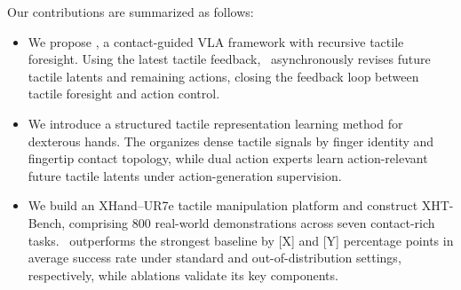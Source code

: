 Our contributions are summarized as follows:



\begin{itemize}
    \item We propose \systemname, a contact-guided VLA framework with recursive tactile foresight. Using the latest tactile feedback, \systemname\ asynchronously revises future tactile latents and remaining actions, closing the feedback loop between tactile foresight and action control.

    \item We introduce a structured tactile representation learning method for dexterous hands. The \Encoder organizes dense tactile signals by finger identity and fingertip contact topology, while dual action experts learn action-relevant future tactile latents under action-generation supervision.

    \item We build an XHand--UR7e tactile manipulation platform and construct XHT-Bench, comprising 800 real-world demonstrations across seven contact-rich tasks. \systemname\ outperforms the strongest baseline by [X] and [Y] percentage points in average success rate under standard and out-of-distribution settings, respectively, while ablations validate its key components.
\end{itemize}








